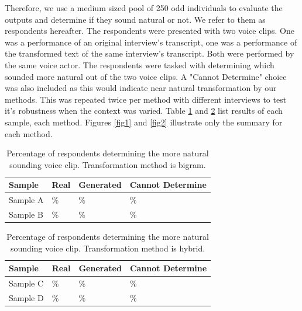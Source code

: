 \documentclass[journal]{IEEEtran}
\begin{document}

Therefore, we use a medium sized pool of 250 odd individuals to evaluate the outputs and determine if they sound natural or not. We refer to them as respondents hereafter. The respondents were presented with two voice clips. One was a performance of an original interview's transcript, one was a performance of the transformed text of the same interview's transcript. Both were performed by the same voice actor. 
The respondents were tasked with determining which sounded more natural out of the two voice clips. A "Cannot Determine" choice was also included as this would indicate near natural transformation by our methods. This was repeated twice per method with different interviews to test it's robustness when the context was varied.
Table \ref{tab2} and \ref{tab3} list results of each sample, each method. Figures \ref{fig1} and \ref{fig2} illustrate only the summary for each method.


\begin{table}
\caption{Percentage of respondents determining the more natural sounding voice clip. Transformation method is bigram.}
\label{tab2}
\small
\setlength{\tabcolsep}{3pt}
\begin{tabular}{|p{60pt}|p{60pt}||p{60pt}|p{60pt}|}
\hline
Sample& 
Real& 
Generated&
Cannot Determine \\
\hline
Sample A & \% & \% & \% \\
Sample B & \% & \% & \% \\
\hline
\end{tabular}
\label{tab2}
\end{table}

\begin{table}
\caption{Percentage of respondents determining the more natural sounding voice clip. Transformation method is hybrid.}
\label{tab3}
\small
\setlength{\tabcolsep}{3pt}
\begin{tabular}{|p{60pt}|p{60pt}||p{60pt}|p{60pt}|}
\hline
Sample& 
Real& 
Generated&
Cannot Determine \\
\hline
Sample C & \% & \% & \% \\
Sample D & \% & \% & \% \\
\hline
\end{tabular}
\label{tab3}
\end{table}
\end{document}
